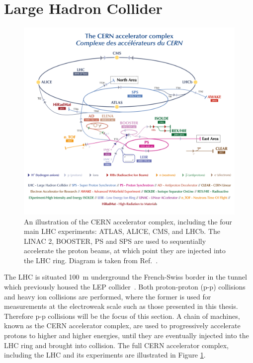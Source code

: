\section{Large Hadron Collider}\label{sec:lhc}

\begin{figure}[htb!]
  \centering
  \includegraphics[width=1\textwidth]{Figures/cms/cern_accelerator.png}
  \caption[The CERN accelerator complex]
  {
    An illustration of the CERN accelerator complex, including the four main LHC experiments: ATLAS, ALICE, CMS, and LHCb. The LINAC 2, BOOSTER, PS and SPS are used to sequentially accelerate the proton beams, at which point they are injected into the LHC ring. Diagram is taken from Ref.~\cite{Mobs:2684277}.
  }
  \label{fig:cern_accelerator_complex}
\end{figure}

The LHC is situated 100~m underground the French-Swiss border in the tunnel which previously housed the LEP collider~\cite{}. Both proton-proton (p-p) collisions and heavy ion collisions are performed, where the former is used for measurements at the electroweak scale such as those presented in this thesis. Therefore p-p collisions will be the focus of this section. A chain of machines, known as the CERN accelerator complex, are used to progressively accelerate protons to higher and higher energies, until they are eventually injected into the LHC ring and brought into collision. The full CERN accelerator complex, including the LHC and its experiments are illustrated in Figure \ref{fig:cern_accelerator_complex}.

